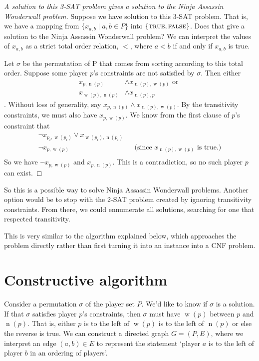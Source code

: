 \documentclass[12pt,x11names, rgb]{article}
\DeclareMathOperator{\w}{w}
\DeclareMathOperator{\n}{n}
\begin{document}
    \begin{proof}[A solution to this 3-SAT problem gives a solution to the Ninja Assassin Wonderwall problem]
    Suppose we have solution to this 3-SAT problem. That is, we have a mapping from $\{x_{a,b} \mid a,b \in P\}$ into $\{\textnormal{\scshape true}, \textnormal{\scshape false}\}$. Does that give a solution to the Ninja Assassin Wonderwall problem? We can interpret the values of $x_{a,b}$ as a strict total order relation, $<$, where $a<b$ if and only if $x_{a,b}$ is true. 

    Let $\sigma$ be the permutation of P that comes from sorting according to this total order. Suppose some player $p$'s constraints are not satisfied by $\sigma$. Then either 
    \begin{align*}
    x_{p,\n(p)} &\wedge x_{\n(p),\w(p)} \text{ or } \\
    x_{\w(p),\n(p)} &\wedge x_{\n(p),p}
    \end{align*}. Without loss of generality, say $x_{p,\n(p)} \wedge x_{\n(p),\w(p)}$. By the transitivity constraints, we must also have $x_{p,\w(p)}$. We know from the first clause of $p$'s constraint that 
    \begin{align*}
        \lnot x_{p_i, \w(p_i)} \vee x_{\w(p_i), \n(p_i)}\\
        \lnot x_{p, \w(p)} &&\text{(since $x_{\n(p),\w(p)}$ is true.)}\\
    \end{align*}
    So we have $\lnot x_{p, \w(p)}$ and $x_{p,\n(p)}$. This is a contradiction, so no such player $p$ can exist.
    \end{proof}

    So this is a possible way to solve Ninja Assassin Wonderwall problems. Another option would be to stop with the 2-SAT problem created by ignoring transitivity constraints. From there, we could ennumerate all solutions, searching for one that respected transitivity. %

    This is very similar to the algorithm explained below, which approaches the problem directly rather than first turning it into an instance into a CNF problem.

\section{Constructive algorithm}
    \label{sec:algorithm}
    Consider a permutation $\sigma$ of the player set $P$. We'd like to know if $\sigma$ is a solution. If that $\sigma$ satisfies player $p$'s constraints, then $\sigma$ must have $\w(p)$ between $p$ and $\n(p)$. That is, either $p$ is to the left of $\w(p)$ is to the left of $\n(p)$ or else the reverse is true. We can construct a directed graph $G=(P,E)$, where we interpret an edge $(a,b) \in E$ to represent the statement `player $a$ is to the left of player $b$ in an ordering of players'. 
\end{document}
